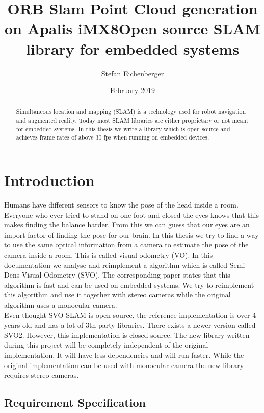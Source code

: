 \documentclass[11pt,a4paper,titlepage,oneside]{report}
\title{ORB Slam Point Cloud generation on Apalis iMX8}
\author{Stefan Eichenberger}
\date{February 2019}
\begin{document}
\title{Open source SLAM library for embedded systems}

\maketitle
\begin{abstract}
  Simultaneous location and mapping (SLAM) is a technology used for robot navigation and augmented reality. Today most SLAM libraries are either proprietary or not meant for embedded systems. In this thesis we write a library which is open source and achieves frame rates of above 30 fps when running on embedded devices.
\end{abstract}

\tableofcontents

\chapter{Introduction}

Humans have different sensors to know the pose of the head inside a room. Everyone who ever tried to stand on one foot and closed the eyes knows that this makes finding the balance harder. From this we can guess that our eyes are an import factor of finding the pose for our brain. In this thesis we try to find a way to use the same optical information from a camera to estimate the pose of the camera inside a room. This is called visual odometry (VO). In this documentation we analyse and reimplement a algorithm which is called Semi-Dens Visual Odometry (SVO). The corresponding paper states that this algorithm is fast and can be used on embedded systems. We try to reimplement this algorithm and use it together with stereo cameras while the original algorithm uses a monocular camera.\\
Even thought SVO SLAM is open source, the reference implementation is over 4 years old and has a lot of 3th party libraries. There exists a newer version called SVO2. However, this implementation is closed source. The new library written during this project will be completely independent of the original implementation. It will have less dependencies and will run faster. While the original implementation can be used with monocular camera the new library requires stereo cameras.

\section{Requirement Specification}
\end{document}
